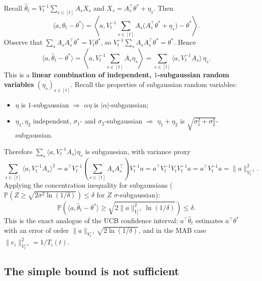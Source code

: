 Recall $\hat{\theta}_t = V_t^{-1}\sum_{s\in[t]} A_sX_s$ and $X_s = A_s^\top\theta^* + \eta_s$. Then
\[
\big\langle a, \hat{\theta}_t - \theta^*\big\rangle = \left\langle a, V_t^{-1}\sum_{s\in[t]} A_s\big(A_s^\top\theta^* + \eta_s\big) - \theta^*\right\rangle.
\]
Observe that $\sum_s A_sA_s^\top\theta^* = V_t\theta^*$, so $V_t^{-1}\sum_s A_sA_s^\top\theta^* = \theta^*$. Hence
\[
\big\langle a, \hat{\theta}_t - \theta^*\big\rangle = \left\langle a, V_t^{-1}\sum_{s\in[t]} A_s\eta_s\right\rangle = \sum_{s\in[t]} \big\langle a, V_t^{-1}A_s\big\rangle\,\eta_s.
\]
This is a \textbf{linear combination of independent, $1$-subgaussian random variables} $(\eta_s)_{s\in[t]}$. Recall the properties of subgaussian random variables:
\begin{itemize}
    \item $\eta$ is $1$-subgaussian $\Rightarrow$ $\alpha\eta$ is $|\alpha|$-subgaussian;
    \item $\eta_1, \eta_2$ independent, $\sigma_1$- and $\sigma_2$-subgaussian $\Rightarrow$ $\eta_1 + \eta_2$ is $\sqrt{\sigma_1^2 + \sigma_2^2}$-subgaussian.
\end{itemize}
Therefore $\sum_s \langle a, V_t^{-1}A_s\rangle\eta_s$ is subgaussian, with variance proxy
\[
\sum_{s\in[t]}\big\langle a, V_t^{-1}A_s\big\rangle^2 = a^\top V_t^{-1}\left(\sum_{s\in[t]} A_sA_s^\top\right)V_t^{-1}a = a^\top V_t^{-1}V_tV_t^{-1}a = a^\top V_t^{-1}a = \|a\|_{V_t^{-1}}^2.
\]
Applying the concentration inequality for subgaussians ($\mathbb{P}(Z \geq \sqrt{2\sigma^2\ln(1/\delta)}) \leq \delta$ for $Z$ $\sigma$-subgaussian):
\[
\mathbb{P}\left(\big\langle a, \hat{\theta}_t - \theta^*\big\rangle \geq \sqrt{2\|a\|_{V_t^{-1}}^2\ln(1/\delta)}\right) \leq \delta.
\]
This is the exact analogue of the UCB confidence interval: $a^\top\hat{\theta}_t$ estimates $a^\top\theta^*$ with an error of order $\|a\|_{V_t^{-1}}\sqrt{2\ln(1/\delta)}$, and in the MAB case $\|e_i\|_{V_t^{-1}}^2 = 1/T_i(t)$.

\subsection{The simple bound is not sufficient}

